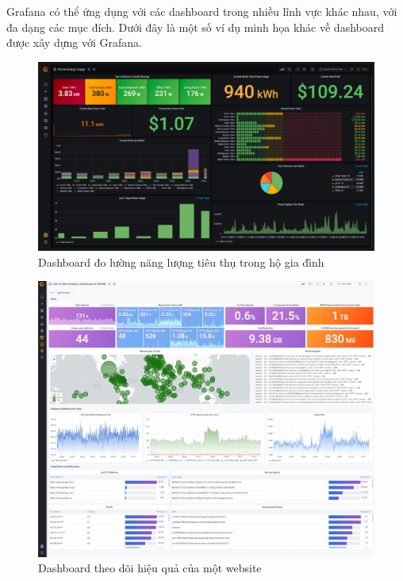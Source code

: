 Grafana có thể ứng dụng với các dashboard trong nhiều lĩnh vực khác nhau, với đa dạng các mục đích. Dưới đây là một số ví dụ minh họa khác về dashboard được xây dựng với Grafana.
\begin{figure}[H] %
    \centering %
    \includegraphics[width=1\textwidth]{figures/Grafana8_HomeEnergy.jpg} 
    \caption{Dashboard đo lường năng lượng tiêu thụ trong hộ gia đình} %
    \label{fig:fig_01}
\end{figure}
\begin{figure}[H] %
    \centering %
    \includegraphics[width=1\textwidth]{figures/Grafana8_WebsitePerformance.jpg} 
    \caption{Dashboard theo dõi hiệu quả của một website} %
    \label{fig:fig_01}
\end{figure}

